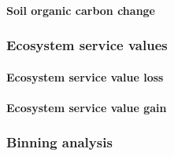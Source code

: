		\paragraph{Soil organic carbon change}

	\subsubsection{Ecosystem service values}
		\paragraph{Ecosystem service value loss}
		\paragraph{Ecosystem service value gain}

	\subsubsection{Binning analysis}